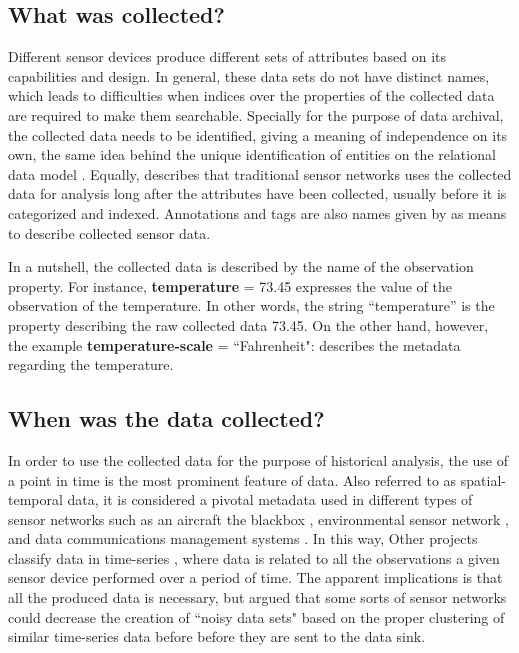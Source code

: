 \subsection{What was collected?}

Different sensor devices produce different sets of attributes based on its
capabilities and design. In general, these data sets do not have distinct
names, which leads to difficulties when indices over the properties of the
collected data are required to make them searchable. Specially for the purpose
of data archival, the collected data needs to be identified, giving a meaning
of independence on its own, the same idea behind the unique identification of
entities on the relational data model \cite{relational-model}. Equally,
\cite{sn-provenance} describes that traditional sensor networks uses the
collected data for analysis long after the attributes have been collected,
usually before it is categorized and indexed. Annotations and tags are also
names given by \cite{sn-provenance} as means to describe collected sensor data.

In a nutshell, the collected data is described by the name of the observation
property. For instance, \textbf{temperature} = 73.45 expresses the value of the
observation of the temperature. In other words, the string ``temperature'' is
the property describing the raw collected data 73.45. On the other hand,
however, the example \textbf{temperature-scale} = ``Fahrenheit": describes
the metadata regarding the temperature.

\subsection{When was the data collected?}

In order to use the collected data for the purpose of historical analysis, the
use of a point in time is the most prominent feature of data. Also referred to
as spatial-temporal data, it is considered a pivotal metadata used in different
types of sensor networks such as an aircraft the blackbox
\cite{sn-exemple-blackbox}, environmental sensor network \cite{sfbeams2006},
and data communications management systems \cite{sn-dataware-house}. In this
way, Other projects classify data in time-series \cite{sn-time-series-example},
where data is related to all the observations a given sensor device performed
over a period of time. The apparent implications is that all the produced data
is necessary, but \cite{sn-time-series} argued that some sorts of sensor
networks could decrease the creation of ``noisy data sets" based on the proper
clustering of similar time-series data before before they are sent to the data
sink.

